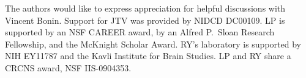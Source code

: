 The authors would like to express appreciation for helpful discussions with Vincent Bonin.  Support for JTV was provided by NIDCD DC00109. LP is supported by an NSF CAREER award, by an Alfred P.\ Sloan Research Fellowship, and the McKnight Scholar Award. RY's laboratory is supported by NIH EY11787 and the Kavli Institute for Brain Studies. LP and RY share a CRCNS award, NSF IIS-0904353.



\appendix

\clearpage

%
%

%

% 

